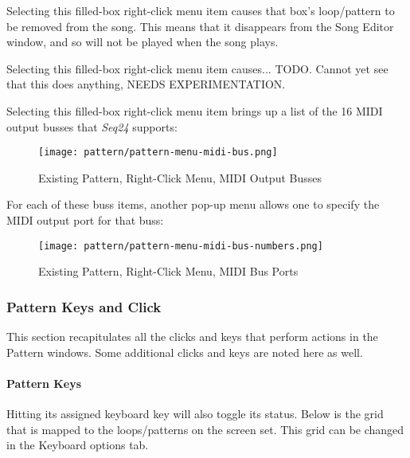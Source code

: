    \setcounter{ItemCounter}{0}      %

   Selecting this filled-box right-click menu item causes that box's
   loop/pattern to be removed from the song.  This means
   that it disappears from the Song Editor window, and so will not
   be played when the song plays.

   Selecting this filled-box right-click menu item causes...
   TODO.  
   Cannot yet see that this does anything, NEEDS EXPERIMENTATION.

   Selecting this filled-box right-click menu item brings up a list
   of the 16 MIDI output busses that \textsl{Seq24} supports:

\begin{figure}[H]
   \centering 
   \texttt{[image: pattern/pattern-menu-midi-bus.png]}
   \caption{Existing Pattern, Right-Click Menu, MIDI Output Busses}
   \label{fig:pattern_window_right_click_midi_bus}
\end{figure}

   For each of these buss items, another pop-up menu allows one
   to specify the MIDI output port for that buss:

\begin{figure}[H]
   \centering 
   \texttt{[image: pattern/pattern-menu-midi-bus-numbers.png]}
   \caption{Existing Pattern, Right-Click Menu, MIDI Bus Ports}
   \label{fig:pattern_window_right_click_midi_bus_numbers}
\end{figure}

\subsubsection{Pattern Keys and Click}
\label{subsubsec:seq24_patterns_pattern_keys_and_clicks}

   This section recapitulates all the clicks and keys that perform actions
   in the Pattern windows.  Some additional clicks and keys are noted here
   as well.

\paragraph{Pattern Keys}
\label{paragraph:seq24_patterns_pattern_keys}

   Hitting its assigned keyboard key will
   also toggle its status.  Below is the grid that is
   mapped to the loops/patterns on the screen set.
   This grid can be changed in the Keyboard options tab.

